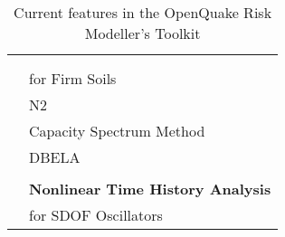 \begin{table}[!htbp]
\begin{tabular}{|l|l|}
                    & \citet{VidicEtAl1994} \\
                    & \citet{LinMiranda2008} \\
                    & \citet{Miranda2000} for Firm Soils \\
                    & N2 \citep{CEN2005} \\
                    & Capacity Spectrum Method \citep{FEMA4402005} \\
                    & DBELA \citep{SilvaEtAl2013} \\
                    & \\
                    & \textbf{Nonlinear Time History Analysis} \\
                    & for SDOF Oscillators \\ \hline
\end{tabular}
\caption{Current features in the OpenQuake Risk Modeller's Toolkit}
\label{tab:current_features}

\end{table}